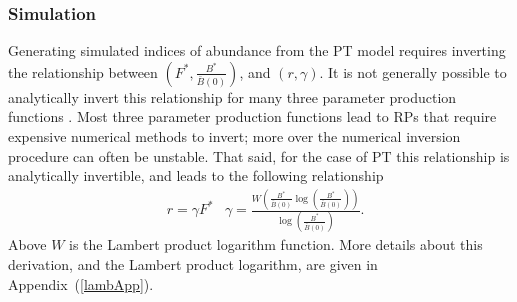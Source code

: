\documentclass[12pt]{article}
\begin{document}
%
%
%
%


\subsubsection{Simulation}

Generating simulated indices of abundance from the PT model requires
inverting the relationship between $\left(F^*, \frac{B^*}{\bar B(0)}\right)$, and
$(r, \gamma)$. It is not generally possible to analytically invert this
relationship for many three parameter production functions . %
Most three parameter production functions lead to RPs that require expensive 
numerical methods to invert; more over the numerical inversion procedure can %
often be unstable. That said, for the case of PT this relationship is
analytically invertible, and leads to the following relationship
%
\begin{align}
&r = \gamma F^* 
&\gamma = \frac{W\left(\frac{B^*}{\bar B(0)}\log\left(\frac{B^*}{\bar B(0)}\right)\right)}{\log\left(\frac{B^*}{\bar B(0)}\right)}. \label{gammaOfB}
\end{align}
%
Above $W$ is the Lambert product logarithm function. More details about this 
derivation, and the Lambert product logarithm, are given in \mbox{Appendix (\ref{lambApp}).}
\end{document}

